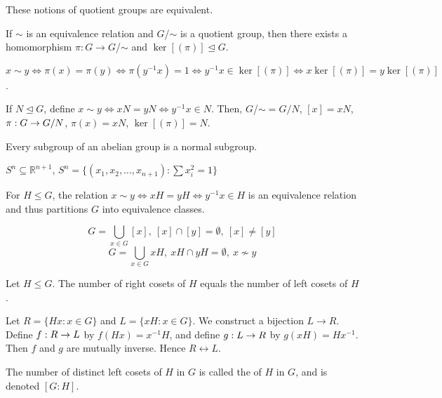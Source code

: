 \documentclass[11pt,letterpaper]{jacky}
\begin{document}
These notions of quotient groups are equivalent.

\begin{prop}
    If $\sim$ is an equivalence relation and $G$/$\sim$ is a quotient group, then there exists a homomorphism $\pi:G\rightarrow G$/$\sim$ and $\ker[(\pi)]\unlhd G$.
\end{prop}

\begin{pf}
    $x\sim y\Leftrightarrow \pi(x)=\pi(y)\Leftrightarrow \pi(y^{-1}x)=1\Leftrightarrow y^{-1}x\in\ker[(\pi)]\Leftrightarrow x\ker[(\pi)]=y\ker[(\pi)]$.
\end{pf}

If $N\unlhd G$, define $x\sim y\Leftrightarrow xN=yN\Leftrightarrow y^{-1}x\in N$. Then, $G$/$\sim=G/N$, $[x]=xN$, $\hmap[\pi]{G}{G/N}$, $\pi(x)=xN$, $\ker[(\pi)]=N$.

\begin{prop}
    Every subgroup of an abelian group is a normal subgroup.
\end{prop}

\begin{defi}
    $S^n\subseteq\mathbb{R}^{n+1}$, $S^n=\{(x_1,x_2,\ldots,x_{n+1}):\sum x_i^2=1\}$
\end{defi}

For $H\le G$, the relation $x\sim y\Leftrightarrow xH=yH\Leftrightarrow y^{-1}x\in H$ is an equivalence relation and thus partitions $G$ into equivalence classes.

$$G=\bigcup\limits_{x\in G}[x],\ [x]\cap[y]=\emptyset,\ [x]\ne[y]$$
$$G=\bigcup\limits_{x\in G}xH,\ xH\cap yH=\emptyset,\ x\nsim y$$

\begin{prop}
    Let $H\le G$. The number of right cosets of $H$ equals the number of left cosets of $H$.
\end{prop}

\begin{pf}
    Let $R=\{Hx:x\in G\}$ and $L=\{xH:x\in G\}$. We construct a bijection $L\rightarrow R$. Define $\hmap[f]{R}{L}$ by $f(Hx)=x^{-1}H$, and define $\hmap[g]{L}{R}$ by $g(xH)=Hx^{-1}$. Then $f$ and $g$ are mutually inverse. Hence $R\leftrightarrow L$.
\end{pf}

\begin{defi}
    The number of distinct left cosets of $H$ in $G$ is called the  of $H$ in $G$, and is denoted $[G:H]$.
\end{defi}
\end{document}
